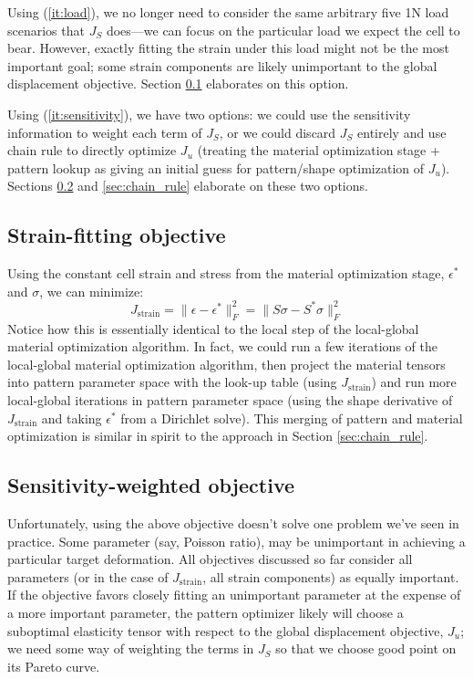 \documentclass[10pt]{article}
\providecommand{\norm}[1]{\lVert#1\rVert}
\begin{document}
Using (\ref{it:load}), we no longer need to consider the same arbitrary five 1N
load scenarios that $J_S$ does---we can focus on the particular load we expect
the cell to bear. However, exactly fitting the strain under this load might not
be the most important goal; some strain components are likely unimportant to
the global displacement objective. Section \ref{sec:strain_fit} elaborates on this option.

Using (\ref{it:sensitivity}), we have two options: we could use the sensitivity
information to weight each term of $J_S$, or we could discard $J_S$ entirely
and use chain rule to directly optimize $J_u$ (treating
the material optimization stage + pattern lookup as giving an initial guess for
pattern/shape optimization of $J_u$). Sections \ref{sec:sensitivity_weight}
and \ref{sec:chain_rule} elaborate on these two options.

\subsection{Strain-fitting objective}
\label{sec:strain_fit}
Using the constant cell strain and stress from the material optimization stage,
$\epsilon^*$ and $\sigma$, we can minimize:
$$
J_\text{strain} = \norm{\epsilon - \epsilon^*}^2_F = \norm{S \sigma - S^* \sigma}_F^2
$$
Notice how this is essentially identical to the local step of the local-global
material optimization algorithm. In fact, we could run a few iterations of the
local-global material optimization algorithm, then project the material tensors into
pattern parameter space with the look-up table (using $J_\text{strain}$) and
run more local-global iterations in pattern parameter space  (using the shape
derivative of $J_\text{strain}$ and taking $\epsilon^*$ from a Dirichlet
solve). This merging of pattern and material optimization is similar in spirit to
the approach in Section \ref{sec:chain_rule}.

\subsection{Sensitivity-weighted objective}
\label{sec:sensitivity_weight}
Unfortunately, using the above objective doesn't solve one problem we've seen in
practice. Some parameter (say, Poisson ratio), may be unimportant in
achieving a particular target deformation. All objectives discussed so far consider all
parameters (or in the case of $J_\text{strain}$, all strain components)
as equally important. If the objective favors closely fitting an unimportant
parameter at the expense of a more important parameter, the pattern optimizer
likely will choose a suboptimal elasticity tensor with respect to the global
displacement objective, $J_u$; we need some way of weighting the terms in $J_S$ so
that we choose good point on its Pareto curve.
\end{document}
